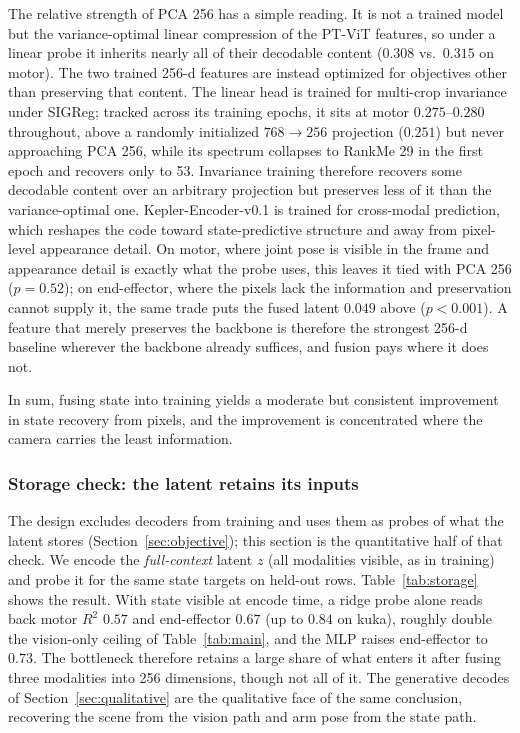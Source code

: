 \documentclass{article}
\begin{document}
The relative strength of PCA 256 has a simple reading. It is not a trained model but the variance-optimal linear compression of the PT-ViT features, so under a linear probe it inherits nearly all of their decodable content ($0.308$ vs.\ $0.315$ on motor). The two trained 256-d features are instead optimized for objectives other than preserving that content. The linear head is trained for multi-crop invariance under SIGReg; tracked across its training epochs, it sits at motor $0.275$--$0.280$ throughout, above a randomly initialized $768\!\rightarrow\!256$ projection ($0.251$) but never approaching PCA 256, while its spectrum collapses to RankMe 29 in the first epoch and recovers only to 53. Invariance training therefore recovers some decodable content over an arbitrary projection but preserves less of it than the variance-optimal one. Kepler-Encoder-v0.1 is trained for cross-modal prediction, which reshapes the code toward state-predictive structure and away from pixel-level appearance detail. On motor, where joint pose is visible in the frame and appearance detail is exactly what the probe uses, this leaves it tied with PCA 256 ($p=0.52$); on end-effector, where the pixels lack the information and preservation cannot supply it, the same trade puts the fused latent $0.049$ above ($p<0.001$). A feature that merely preserves the backbone is therefore the strongest 256-d baseline wherever the backbone already suffices, and fusion pays where it does not.

In sum, fusing state into training yields a moderate but consistent improvement in state recovery from pixels, and the improvement is concentrated where the camera carries the least information.

\subsubsection{Storage check: the latent retains its inputs}
\label{sec:storage}
The design excludes decoders from training and uses them as probes of what the latent stores (Section~\ref{sec:objective}); this section is the quantitative half of that check. We encode the \emph{full-context} latent $z$ (all modalities visible, as in training) and probe it for the same state targets on held-out rows. Table~\ref{tab:storage} shows the result. With state visible at encode time, a ridge probe alone reads back motor $R^2$ $0.57$ and end-effector $0.67$ (up to $0.84$ on kuka), roughly double the vision-only ceiling of Table~\ref{tab:main}, and the MLP raises end-effector to $0.73$. The bottleneck therefore retains a large share of what enters it after fusing three modalities into 256 dimensions, though not all of it. The generative decodes of Section~\ref{sec:qualitative} are the qualitative face of the same conclusion, recovering the scene from the vision path and arm pose from the state path.
\end{document}
